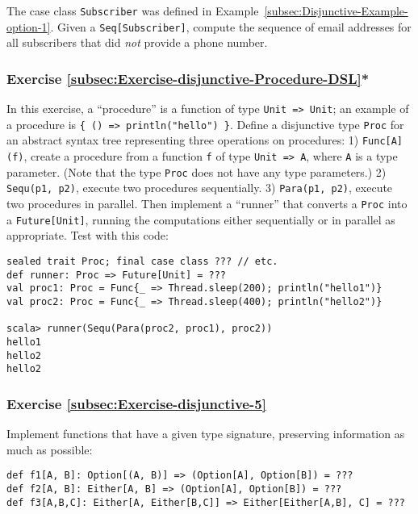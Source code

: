 The case class \lstinline!Subscriber! was defined in Example~\ref{subsec:Disjunctive-Example-option-1}.
Given a \lstinline!Seq[Subscriber]!, compute the sequence of email
addresses for all subscribers that did \emph{not} provide a phone
number.

\subsubsection{Exercise \label{subsec:Exercise-disjunctive-Procedure-DSL}\ref{subsec:Exercise-disjunctive-Procedure-DSL}{*}}

In this exercise, a \textsf{``}procedure\textsf{''} is a function
of type \lstinline!Unit => Unit!; an example of a procedure is \lstinline!{ () => println("hello") }!.
Define a disjunctive type \lstinline!Proc! for an abstract syntax
tree representing three operations on procedures: 1) \lstinline!Func[A](f)!,
create a procedure from a function \lstinline!f! of type \lstinline!Unit => A!,
where \lstinline!A! is a type parameter. (Note that the type \lstinline!Proc!
does not have any type parameters.) 2) \lstinline!Sequ(p1, p2)!,
execute two procedures sequentially. 3) \lstinline!Para(p1, p2)!,
execute two procedures in parallel. Then implement a \textsf{``}runner\textsf{''}
that converts a \lstinline!Proc! into a \lstinline!Future[Unit]!,
running the computations either sequentially or in parallel as appropriate.
Test with this code:
\begin{lstlisting}
sealed trait Proc; final case class ??? // etc.
def runner: Proc => Future[Unit] = ???
val proc1: Proc = Func{_ => Thread.sleep(200); println("hello1")}
val proc2: Proc = Func{_ => Thread.sleep(400); println("hello2")}

scala> runner(Sequ(Para(proc2, proc1), proc2))
hello1
hello2
hello2
\end{lstlisting}


\subsubsection{Exercise \label{subsec:Exercise-disjunctive-5}\ref{subsec:Exercise-disjunctive-5}}

Implement functions that have a given type signature, preserving information
as much as possible: 
\begin{lstlisting}
def f1[A, B]: Option[(A, B)] => (Option[A], Option[B]) = ???
def f2[A, B]: Either[A, B] => (Option[A], Option[B]) = ???
def f3[A,B,C]: Either[A, Either[B,C]] => Either[Either[A,B], C] = ???
\end{lstlisting}


